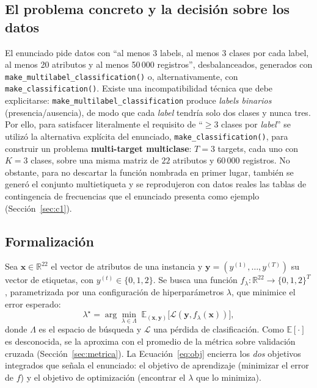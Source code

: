 \documentclass[11pt,a4paper,twocolumn]{article}
\providecommand{\Nsamples}{60\,000}\providecommand{\Nfeatures}{22}
\providecommand{\Ntargets}{3}\providecommand{\Nclasses}{3}
\begin{document}
\subsection{El problema concreto y la decisión sobre los datos}
El enunciado pide datos con ``al menos 3 labels, al menos 3 clases por cada label, al menos 20 atributos y
al menos 50\,000 registros'', desbalanceados, generados con \texttt{make\_multilabel\_classification()} o,
alternativamente, con \texttt{make\_classification()}. Existe una incompatibilidad técnica que debe
explicitarse: \texttt{make\_multilabel\_classification} produce \emph{labels binarios} (presencia/ausencia),
de modo que cada \textit{label} tendría solo dos clases y nunca tres. Por ello, para satisfacer
literalmente el requisito de ``$\geq 3$ clases por \textit{label}'' se utilizó la alternativa explícita del
enunciado, \texttt{make\_classification()}, para construir un problema \textbf{multi-target multiclase}:
$T=\Ntargets{}$ targets, cada uno con $K=\Nclasses{}$ clases, sobre una misma matriz de
$\Nfeatures{}$ atributos y $\Nsamples{}$ registros. No obstante, para no descartar la función nombrada en
primer lugar, también se generó el conjunto multietiqueta y se reprodujeron con datos reales las tablas de
contingencia de frecuencias que el enunciado presenta como ejemplo (Sección~\ref{sec:c1}).

\subsection{Formalización}
Sea $\mathbf{x}\in\mathbb{R}^{\Nfeatures{}}$ el vector de atributos de una instancia y
$\mathbf{y}=(y^{(1)},\dots,y^{(T)})$ su vector de etiquetas, con $y^{(t)}\in\{0,1,2\}$. Se busca una función
$f_\lambda:\mathbb{R}^{\Nfeatures{}}\!\to\!\{0,1,2\}^{T}$, parametrizada por una configuración de
hiperparámetros $\lambda$, que minimice el error esperado:
\begin{equation}
\lambda^\star=\arg\min_{\lambda\in\Lambda}\;\mathbb{E}_{(\mathbf{x},\mathbf{y})}\!\big[\mathcal{L}(\mathbf{y},f_\lambda(\mathbf{x}))\big],
\label{eq:obj}
\end{equation}
donde $\Lambda$ es el espacio de búsqueda y $\mathcal{L}$ una pérdida de clasificación. Como
$\mathbb{E}[\cdot]$ es desconocida, se la aproxima con el promedio de la métrica sobre validación cruzada
(Sección~\ref{sec:metrica}). La Ecuación~\eqref{eq:obj} encierra los \emph{dos} objetivos integrados que
señala el enunciado: el objetivo de aprendizaje (minimizar el error de $f$) y el objetivo de optimización
(encontrar el $\lambda$ que lo minimiza).
\end{document}
